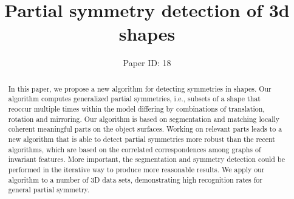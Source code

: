 \documentclass[twocolumn]{svjour3}          %
\begin{document}
\title{Partial symmetry detection of 3d shapes}
\subtitle{}
\author{Paper ID: 18}
\institute{}
\date{ }%

\maketitle

\begin{abstract}
In this paper, we propose a new algorithm for detecting symmetries in shapes.
Our algorithm computes generalized partial symmetries, i.e.,
subsets of a shape that reoccur multiple times within the model differing by combinations of translation, rotation and mirroring.
Our algorithm is based on segmentation and matching locally coherent meaningful parts on the object surfaces.
Working on relevant parts leads to a new algorithm that is able to detect partial symmetries more robust than the recent algorithms,
which are based on the correlated correspondences among graphs of invariant features.
More important, the segmentation and symmetry detection could be performed in the iterative way to produce more reasonable results. 
We apply our algorithm to a number of 3D data sets, demonstrating high recognition rates for general partial symmetry.

\end{abstract}









\end{document}
